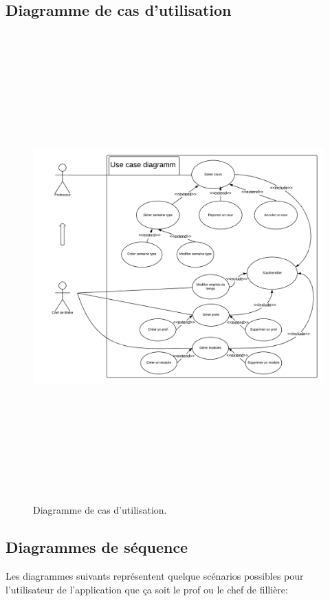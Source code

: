 \subsection{Diagramme de cas d'utilisation}
 \begin{figure}[!htb]
      \centering
        \includegraphics[width=15cm,height=18cm]{img/UseCase.png}
        \caption{Diagramme de cas d'utilisation. }
    \end{figure}
\newpage 

\subsection{Diagrammes de séquence}
Les diagrammes suivants représentent quelque scénarios possibles pour l'utilisateur de l'application que ça soit le prof ou le chef de fillière:
